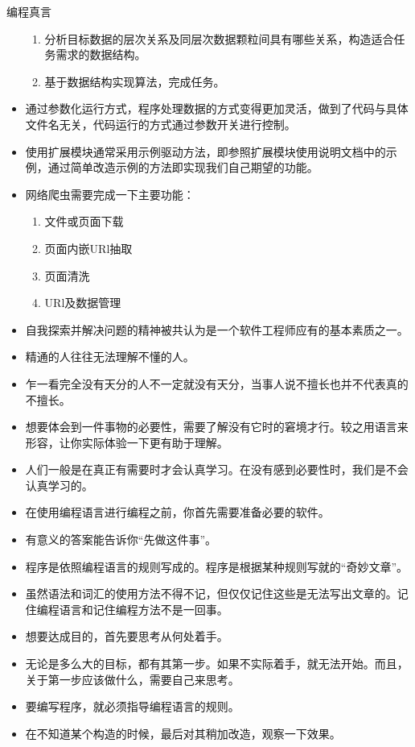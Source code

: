 \begin{frame}
\begin{block}{编程真言}
\begin{itemize}
\begin{enumerate}
          \item 分析目标数据的层次关系及同层次数据颗粒间具有哪些关系，构造适合任务需求的数据结构。
          \item 基于数据结构实现算法，完成任务。
        \end{enumerate}
      \item 通过参数化运行方式，程序处理数据的方式变得更加灵活，做到了代码与具体文件名无关，代码运行的方式通过参数开关进行控制。
      \item 使用扩展模块通常采用示例驱动方法，即参照扩展模块使用说明文档中的示例，通过简单改造示例的方法即实现我们自己期望的功能。
      \item 网络爬虫需要完成一下主要功能：
        \begin{enumerate}
          \item 文件或页面下载
          \item 页面内嵌URl抽取
          \item 页面清洗
          \item URl及数据管理
        \end{enumerate}
      \item 自我探索并解决问题的精神被共认为是一个软件工程师应有的基本素质之一。 
      \item 精通的人往往无法理解不懂的人。
      \item 乍一看完全没有天分的人不一定就没有天分，当事人说不擅长也并不代表真的不擅长。
      \item 想要体会到一件事物的必要性，需要了解没有它时的窘境才行。较之用语言来形容，让你实际体验一下更有助于理解。
      \item 人们一般是在真正有需要时才会认真学习。在没有感到必要性时，我们是不会认真学习的。
      \item 在使用编程语言进行编程之前，你首先需要准备必要的软件。
      \item 有意义的答案能告诉你“先做这件事”。
      \item 程序是依照编程语言的规则写成的。程序是根据某种规则写就的“奇妙文章”。
      \item 虽然语法和词汇的使用方法不得不记，但仅仅记住这些是无法写出文章的。记住编程语言和记住编程方法不是一回事。
      \item 想要达成目的，首先要思考从何处着手。
      \item 无论是多么大的目标，都有其第一步。如果不实际着手，就无法开始。而且，关于第一步应该做什么，需要自己来思考。
      \item 要编写程序，就必须指导编程语言的规则。
      \item 在不知道某个构造的时候，最后对其稍加改造，观察一下效果。

\end{itemize}
\end{block}
\end{frame}
